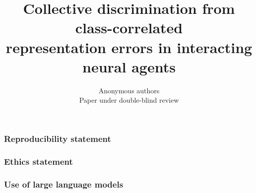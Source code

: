 \documentclass{article}
\title{Collective discrimination from class-correlated\\representation errors in interacting neural agents}
\author{Anonymous authors\\Paper under double-blind review}
\begin{document}
\maketitle

\begin{abstract}

\end{abstract}










\subsubsection*{Reproducibility statement}


\subsubsection*{Ethics statement}


\subsubsection*{Use of large language models}





\appendix




\end{document}
